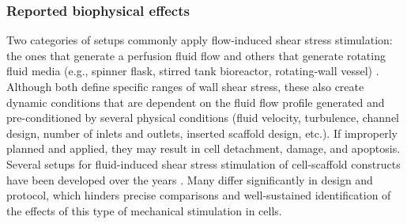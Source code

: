 \subsubsection{Reported biophysical effects}
Two categories of setups commonly apply flow-induced shear stress stimulation: the ones that generate a perfusion fluid flow \cite{McCoy2012-jv} and others that generate rotating fluid media (e.g., spinner flask, stirred tank bioreactor, rotating-wall vessel) \cite{Melke2018-kv}. Although both define specific ranges of wall shear stress, these also create dynamic conditions that are dependent on the fluid flow profile generated and pre-conditioned by several physical conditions (fluid velocity, turbulence, channel design, number of inlets and outlets, inserted scaffold design, etc.). If improperly planned and applied, they may result in cell detachment, damage, and apoptosis. Several setups for fluid-induced shear stress stimulation of cell-scaffold constructs have been developed over the years \cite{Alvarez-Barreto2011-lj, Filipowska2016-cd, Gardel2013-cs, Jaasma2008-oe}. Many differ significantly in design and protocol, which hinders precise comparisons and well-sustained identification of the effects of this type of mechanical stimulation in cells.

